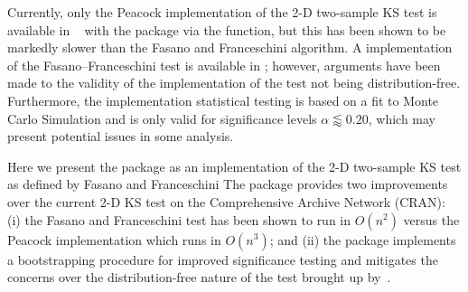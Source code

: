 \documentclass[codesnippet]{jss}
\newcommand{\fct}[1]{\code{#1()}}
\begin{document}
Currently, only the Peacock implementation of the 2-D two-sample KS test is available in ~\citep{R} with the  package via the \fct{peacock2} function, but this has been shown to be markedly slower than the Fasano and Franceschini algorithm\citep{Lopes2007}. A  implementation of the Fasano--Franceschini test is available in \citep{numericalRecipes}; however, arguments have been made to the validity of the implementation of the test not being distribution-free\citep{Babu2006}. Furthermore, the  implementation statistical testing is based on a fit to Monte Carlo Simulation and is only valid for significance levels $\alpha \lessapprox 0.20$, which may present potential issues in some analysis.

Here we present the  package as an  implementation of the 2-D two-sample KS test as defined by Fasano and Franceschini \citep{Fasano1987} The  package provides two improvements over the current 2-D KS test on the Comprehensive  Archive Network (CRAN): (i) the Fasano and Franceschini test has been shown to run in $O(n^2)$ versus the Peacock implementation which runs in $O(n^3)$; and (ii) the package implements a bootstrapping procedure for improved significance testing and mitigates the concerns over the distribution-free nature of the test brought up by~\citep{Babu2006}.
\end{document}
